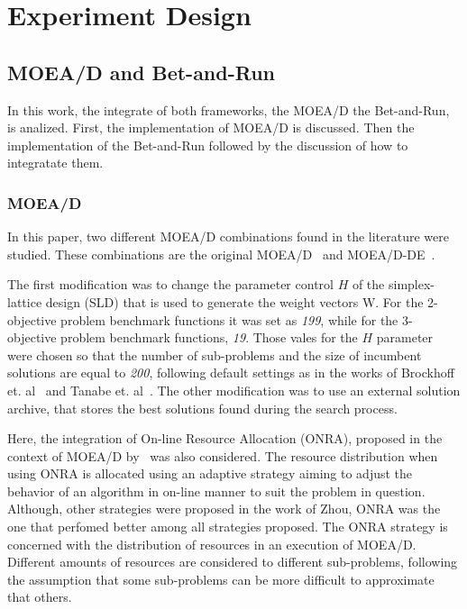 \section{Experiment Design}

\subsection{MOEA/D and Bet-and-Run}

In this work, the integrate of both frameworks, the MOEA/D the Bet-and-Run, is analized. First, the implementation of MOEA/D is discussed. Then the implementation of the Bet-and-Run followed by the discussion of how to integratate them.

\subsubsection{MOEA/D}

In this paper, two different MOEA/D combinations found in the literature  were studied. These combinations are the original MOEA/D~\cite{zhang2007moea} and MOEA/D-DE~\cite{li2009multiobjective}. 

The first modification was to change the parameter control $H$ of the simplex-lattice design (SLD) that is used to generate the weight vectors W. For the 2-objective problem benchmark functions it was set as \textit{199}, while for the 3-objective problem benchmark functions, \textit{19}. Those vales for the $H$ parameter were chosen so that the number of sub-problems and the size of incumbent solutions are equal to \textit{200}, following default settings as in the works of Brockhoff et. al~\cite{brockhoff2015benchmarking} and Tanabe et. al~\cite{tanabe2018analysis}. The other modification was to use an external solution archive, that stores the best solutions found during the search process.



Here, the integration of On-line Resource Allocation (ONRA), proposed in the context of MOEA/D by~\cite{zhou2016all} was also considered. The resource distribution when using ONRA is allocated using an adaptive strategy aiming to adjust the behavior of an algorithm in on-line manner to suit the problem in question. Although, other strategies were proposed in the work of Zhou, ONRA was the one that perfomed better among all strategies proposed. The ONRA strategy is concerned with the distribution of resources in an execution of MOEA/D. Different amounts of resources are considered to different sub-problems, following the assumption that some sub-problems can be more difficult to approximate that others.

